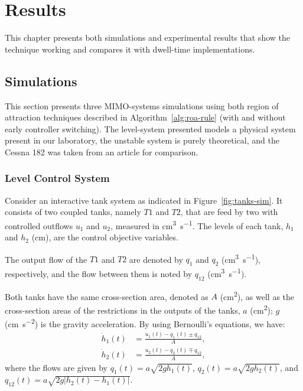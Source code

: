 
\chapter{Results}%
\label{chp:results}

This chapter presents both simulations and experimental results that show the
technique working and compares it with dwell-time implementations.

\section{Simulations}%
\label{sec:simulation}

This section presents three MIMO-systems simulations using both region of
attraction techniques described in Algorithm~\ref{alg:roa-rule} (with and
without early controller switching). The level-system presented models a
physical system present in our laboratory, the unstable system is purely
theoretical, and the Cessna 182 was taken from an article for comparison.

\subsection{Level Control System}%
\label{subsec:tanks-system}

Consider an interactive tank system as indicated in Figure~\ref{fig:tanks-sim}.
It consists of two coupled tanks, namely \(T1\) and \(T2\), that are feed by two
with controlled outflows \(u_1\) and \(u_2\), measured in
\si{\cubic\centi\metre\per\second}. The levels of each tank, \(h_1\) and \(h_2\)
(\si{\centi\metre}), are the control objective variables.



The output flow of the \(T1\) and \(T2\) are denoted by \(q_1\) and \(q_2\)
(\si{\cubic\centi\metre\per\second}), respectively, and the flow between them is
noted by \(q_{12}\) (\si{\cubic\centi\metre\per\second}).

Both tanks have the same cross-section area, denoted as \(A\)
(\si{\square\centi\metre}), as well as the cross-section areas of the restrictions in
the outputs of the tanks, \(a\) (\si{\square\centi\metre}); \(g\)
(\si{\centi\metre\per\square\second}) is the gravity acceleration. By using
Bernoulli's equations, we have:
%
\begin{equation}
  \label{eq:formula-height-variation-lin}
  \begin{aligned}
    \dot{h}_1(t) & = \frac{u_1(t)-q_1(t)\pm{}q_{12}}{A}, \\
    \dot{h}_2(t) & = \frac{u_2(t)-q_2(t)\mp{}q_{12}}{A},
  \end{aligned}
\end{equation}
%
where the flows are given by \(q_1(t) = a\sqrt{2gh_1(t)}\),
\(q_2(t) = a\sqrt{2gh_2(t)}\), and
\(q_{12}(t) = a\sqrt{2g\left|h_2(t)-h_1(t)\right|}\).

